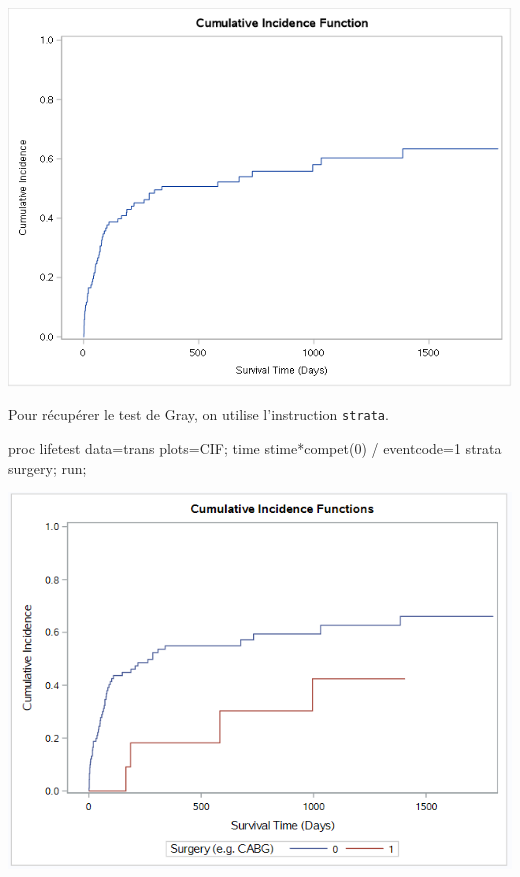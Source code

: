 \documentclass[
  12pt,
  letterpaper,
  DIV=11,
  numbers=noendperiod,
  onepage,
  openany]{scrreprt}
\newenvironment{Shaded}{\begin{snugshade}}{\end{snugshade}}
\newcommand{\DecValTok}[1]{\textcolor[rgb]{0.86,0.86,0.80}{#1}}
\newcommand{\FunctionTok}[1]{\textcolor[rgb]{0.94,0.94,0.56}{#1}}
\newcommand{\NormalTok}[1]{\textcolor[rgb]{0.80,0.80,0.80}{#1}}
\newcommand{\OtherTok}[1]{\textcolor[rgb]{0.94,0.94,0.56}{#1}}
\newcommand{\SpecialCharTok}[1]{\textcolor[rgb]{0.86,0.64,0.64}{#1}}
\begin{document}
\includegraphics{sas/9c.png}

Pour récupérer le test de Gray, on utilise l'instruction
\texttt{strata}.

\begin{Shaded}
\begin{Highlighting}[]
\NormalTok{proc lifetest data}\OtherTok{=}\NormalTok{trans plots}\OtherTok{=}\NormalTok{CIF;}
\NormalTok{time stime}\SpecialCharTok{*}\FunctionTok{compet}\NormalTok{(}\DecValTok{0}\NormalTok{) }\SpecialCharTok{/}\NormalTok{ eventcode}\OtherTok{=}\DecValTok{1}
\NormalTok{strata surgery; run;}
\end{Highlighting}
\end{Shaded}

\includegraphics{sas/9f.PNG}
\end{document}
